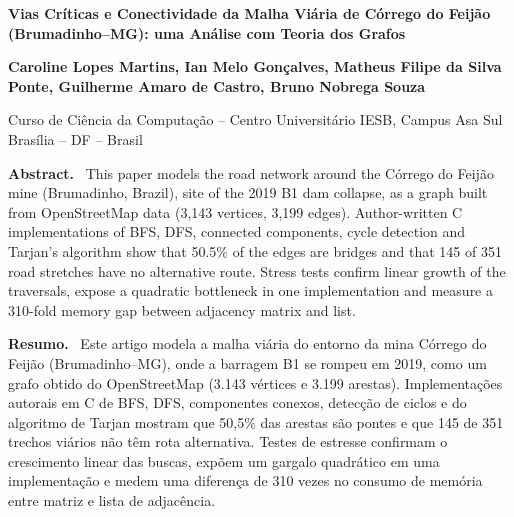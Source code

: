 \documentclass[12pt,a4paper]{article}
\newenvironment{sbcabstract}[1]%
  {\list{}{\leftmargin=0.8cm\rightmargin=0.8cm\topsep=0pt\parsep=0pt}\item[]\textbf{#1.}\ }%
  {\endlist}
\begin{document}
\makeatletter\let\@afterindenttrue\@afterindentfalse\makeatother

\begin{center}
  \vspace*{12pt}
  {\fontsize{16}{19}\selectfont\bfseries
   Vias Críticas e Conectividade da Malha Viária de Córrego do Feijão (Brumadinho--MG): uma Análise com Teoria dos Grafos\par}
  \vspace{12pt}
  {\bfseries Caroline Lopes Martins, Ian Melo Gonçalves, Matheus Filipe da Silva Ponte, Guilherme Amaro de Castro, Bruno Nobrega Souza\par}
  \vspace{12pt}
  Curso de Ciência da Computação -- Centro Universitário IESB, Campus Asa Sul\\ Brasília -- DF -- Brasil\par
\end{center}

\begin{sbcabstract}{Abstract}
This paper models the road network around the Córrego do Feijão mine (Brumadinho, Brazil), site of the 2019 B1 dam collapse, as a graph built from OpenStreetMap data (3,143 vertices, 3,199 edges). Author-written C implementations of BFS, DFS, connected components, cycle detection and Tarjan's algorithm show that 50.5\% of the edges are bridges and that 145 of 351 road stretches have no alternative route. Stress tests confirm linear growth of the traversals, expose a quadratic bottleneck in one implementation and measure a 310-fold memory gap between adjacency matrix and list.
\end{sbcabstract}

\begin{sbcabstract}{Resumo}
Este artigo modela a malha viária do entorno da mina Córrego do Feijão (Brumadinho--MG), onde a barragem B1 se rompeu em 2019, como um grafo obtido do OpenStreetMap (3.143 vértices e 3.199 arestas). Implementações autorais em C de BFS, DFS, componentes conexos, detecção de ciclos e do algoritmo de Tarjan mostram que 50,5\% das arestas são pontes e que 145 de 351 trechos viários não têm rota alternativa. Testes de estresse confirmam o crescimento linear das buscas, expõem um gargalo quadrático em uma implementação e medem uma diferença de 310 vezes no consumo de memória entre matriz e lista de adjacência.
\end{sbcabstract}
\end{document}
